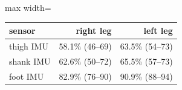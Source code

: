 \begin{adjustbox}{max width=\textwidth}
{\footnotesize
\begin{tabular}{lrr}
\toprule
\textbf{sensor} & \textbf{right leg} & \textbf{left leg} \\
\midrule
thigh IMU & 58.1\% (46--69) & 63.5\% (54--73) \\
shank IMU & 62.6\% (50--72) & 65.5\% (57--73) \\
foot IMU & 82.9\% (76--90) & 90.9\% (88--94) \\
\bottomrule
\end{tabular}
}
\end{adjustbox}
